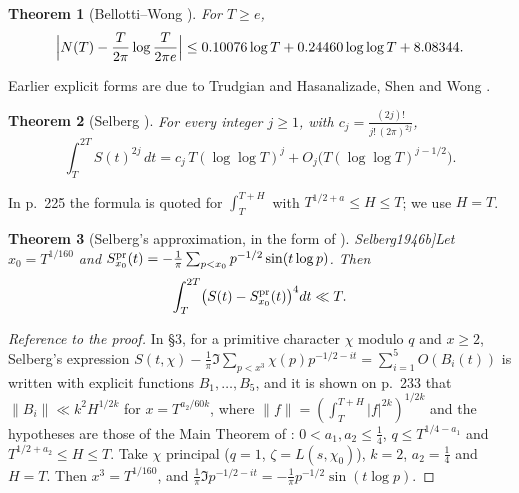 \documentclass[11pt,reqno]{amsart}
\makeatletter
\let\CG@origcite\cite
\renewcommand*{\cite}[2][]{\def\CG@citekey{#2}%
  \ifx\relax#1\relax\CG@origcite{#2}\else\CG@origcite[#1]{#2}\fi}
\numberwithin{equation}{section}
\theoremstyle{plain}
\newtheorem{theorem}{Theorem}[section]
\theoremstyle{definition}
\theoremstyle{remark}
\makeatother
\begin{document}
\begin{theorem}[Bellotti--Wong {\cite{BellottiWong2025}}]\label{thm:known_BW}
For $T\ge e$,
\begin{equation}
\Bigl|N(T)-\frac T{2\pi}\log\frac T{2\pi e}\Bigr|\le0.10076\log T+0.24460\log\log T+8.08344 .
\label{eq:BW_bound}
\end{equation}
\end{theorem}
Earlier explicit forms are due to Trudgian \cite{Trudgian2014} and Hasanalizade, Shen and Wong \cite{HasanalizadeShenWong2022}.

\begin{theorem}[Selberg {\cite{Selberg1946a}}; see {\cite[p.~225]{Fujii1974}} and {\cite[\S9.25]{Titchmarsh1986}}]\label{thm:known_selberg_moments}
For every integer $j\ge1$, with $c_j=\frac{(2j)!}{j!\,(2\pi)^{2j}}$,
\begin{equation}
\int_T^{2T}S(t)^{2j}\,dt=c_j\,T(\log\log T)^j+O_j\bigl(T(\log\log T)^{j-1/2}\bigr).
\label{eq:selberg_moments}
\end{equation}
\end{theorem}
In \cite[p.~225]{Fujii1974} the formula is quoted for $\int_T^{T+H}$ with $T^{1/2+a}\le H\le T$; we use $H=T$.

\begin{theorem}[Selberg's approximation, in the form of {\cite[\S3, pp.~232--233]{Fujii1974}}; \cite{Selberg1946b}]\label{thm:known_selberg_approx}
Let $x_0=T^{1/160}$ and $S^{\rm pr}_{x_0}(t)=-\frac1\pi\sum_{p<x_0}p^{-1/2}\sin(t\log p)$. Then
\begin{equation}
\int_T^{2T}\bigl(S(t)-S^{\rm pr}_{x_0}(t)\bigr)^4dt\ll T .
\label{eq:selberg_approx}
\end{equation}
\end{theorem}

\begin{proof}[Reference to the proof]
In \cite[\S3]{Fujii1974}, for a primitive character $\chi$ modulo $q$ and $x\ge2$, Selberg's expression $S(t,\chi)-\frac1\pi\Im\sum_{p<x^3}\chi(p)p^{-1/2-it}=\sum_{i=1}^5O(B_i(t))$ is written with explicit functions $B_1,\dots,B_5$, and it is shown on p.~233 that $\|B_i\|\ll k^2H^{1/2k}$ for $x=T^{a_2/60k}$, where $\|f\|=(\int_T^{T+H}|f|^{2k})^{1/2k}$ and the hypotheses are those of the Main Theorem of \cite{Fujii1974}: $0<a_1,a_2\le\frac14$, $q\le T^{1/4-a_1}$ and $T^{1/2+a_2}\le H\le T$. Take $\chi$ principal ($q=1$, $\zeta=L(s,\chi_0)$), $k=2$, $a_2=\frac14$ and $H=T$. Then $x^3=T^{1/160}$, and $\frac1\pi\Im p^{-1/2-it}=-\frac1\pi p^{-1/2}\sin(t\log p)$.
\end{proof}
\end{document}
